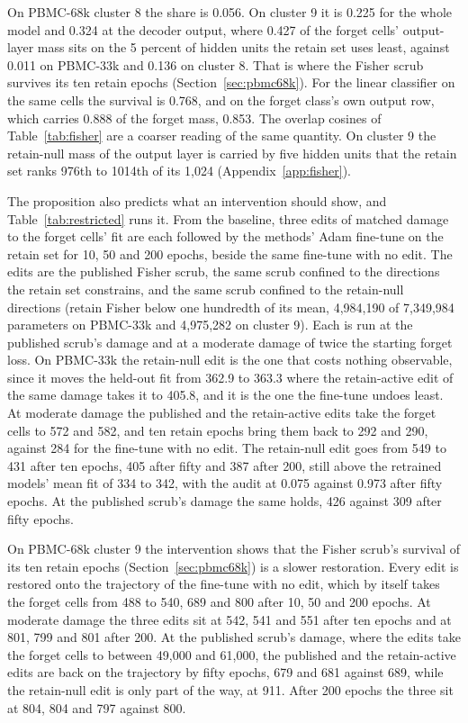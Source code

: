 \documentclass{article}
\begin{document}
On PBMC-68k cluster 8 the share is 0.056. On cluster 9 it is 0.225 for the whole model and 0.324 at the decoder output, where 0.427 of the forget cells' output-layer mass sits on the 5 percent of hidden units the retain set uses least, against 0.011 on PBMC-33k and 0.136 on cluster 8. That is where the Fisher scrub survives its ten retain epochs (Section~\ref{sec:pbmc68k}). For the linear classifier on the same cells the survival is 0.768, and on the forget class's own output row, which carries 0.888 of the forget mass, 0.853. The overlap cosines of Table~\ref{tab:fisher} are a coarser reading of the same quantity. On cluster 9 the retain-null mass of the output layer is carried by five hidden units that the retain set ranks 976th to 1014th of its 1,024 (Appendix~\ref{app:fisher}).

The proposition also predicts what an intervention should show, and Table~\ref{tab:restricted} runs it. From the baseline, three edits of matched damage to the forget cells' fit are each followed by the methods' Adam fine-tune on the retain set for 10, 50 and 200 epochs, beside the same fine-tune with no edit. The edits are the published Fisher scrub, the same scrub confined to the directions the retain set constrains, and the same scrub confined to the retain-null directions (retain Fisher below one hundredth of its mean, 4,984,190 of 7,349,984 parameters on PBMC-33k and 4,975,282 on cluster 9). Each is run at the published scrub's damage and at a moderate damage of twice the starting forget loss. On PBMC-33k the retain-null edit is the one that costs nothing observable, since it moves the held-out fit from 362.9 to 363.3 where the retain-active edit of the same damage takes it to 405.8, and it is the one the fine-tune undoes least. At moderate damage the published and the retain-active edits take the forget cells to 572 and 582, and ten retain epochs bring them back to 292 and 290, against 284 for the fine-tune with no edit. The retain-null edit goes from 549 to 431 after ten epochs, 405 after fifty and 387 after 200, still above the retrained models' mean fit of 334 to 342, with the audit at 0.075 against 0.973 after fifty epochs. At the published scrub's damage the same holds, 426 against 309 after fifty epochs.

On PBMC-68k cluster 9 the intervention shows that the Fisher scrub's survival of its ten retain epochs (Section~\ref{sec:pbmc68k}) is a slower restoration. Every edit is restored onto the trajectory of the fine-tune with no edit, which by itself takes the forget cells from 488 to 540, 689 and 800 after 10, 50 and 200 epochs. At moderate damage the three edits sit at 542, 541 and 551 after ten epochs and at 801, 799 and 801 after 200. At the published scrub's damage, where the edits take the forget cells to between 49,000 and 61,000, the published and the retain-active edits are back on the trajectory by fifty epochs, 679 and 681 against 689, while the retain-null edit is only part of the way, at 911. After 200 epochs the three sit at 804, 804 and 797 against 800.
\end{document}
